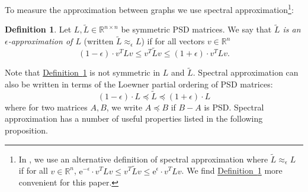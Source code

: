 \documentclass[11pt]{article}
\numberwithin{equation}{section}
\theoremstyle{definition}
\newtheorem{definition}[theorem]{Definition}
\theoremstyle{plain}
\newcommand{\eee}{\mathrm e}
\newcommand{\expref}[2]{\hyperref[#2]{#1~\ref{#2}}}
\newcommand{\wt}{\widetilde}   %
\numberwithin{myalgctr}{section}
\theoremstyle{named}
\begin{document}
To measure the approximation between graphs we use spectral approximation\footnote{In \cite{derandbeyond2017}, we use an alternative definition of spectral approximation where $\wt{L}\approx_{\epsilon}L$ if for all $v\in\mathbb{R}^n$, $\eee^{-\epsilon}\cdot v^{T}Lv\leq v^T\wt{L}v\leq \eee^{\epsilon}\cdot v^{T}Lv$. We find \expref{Definition}{def:spectralapprox} more convenient for this paper.}\cite{ST04}:
\begin{definition}
\label{def:spectralapprox}
Let $L, \wt{L}\in\mathbb{R}^{n\times n}$ be symmetric PSD matrices. We say that \emph{$\wt{L}$ is an \emph{$\epsilon$-approximation} of $L$} (written $\wt{L}\approx_{\epsilon}L$) if for all vectors $v\in\mathbb{R}^n$
\[
(1-\epsilon)\cdot v^{T}Lv \leq v^{T}\wt{L}v \leq (1+\epsilon)\cdot v^{T}Lv.
\]
\end{definition}
Note that \expref{Definition}{def:spectralapprox} is not symmetric in $L$ and $\wt{L}$. Spectral approximation can also be written in terms of the Loewner partial ordering of PSD matrices:
\[
(1-\epsilon)\cdot L \preceq \wt{L} \preceq (1+\epsilon)\cdot L
\]
where for two matrices $A,B$, we write $A\preceq B$ if $B-A$ is PSD. Spectral approximation has a number of useful properties listed in the following proposition. 
\end{document}
